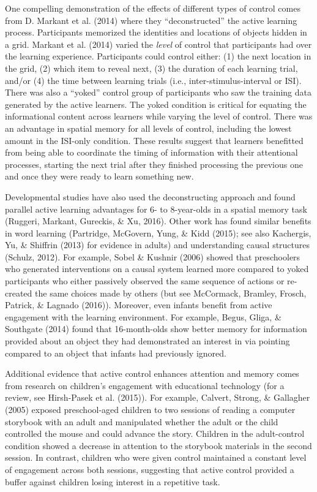 \documentclass[oneside]{report}
\begin{document}
One compelling demonstration of the effects of different types of
control comes from D. Markant et al. (2014) where they ``deconstructed''
the active learning process. Participants memorized the identities and
locations of objects hidden in a grid. Markant et al. (2014) varied the
\emph{level} of control that participants had over the learning
experience. Participants could control either: (1) the next location in
the grid, (2) which item to reveal next, (3) the duration of each
learning trial, and/or (4) the time between learning trials (i.e.,
inter-stimulus-interval or ISI). There was also a ``yoked'' control
group of participants who saw the training data generated by the active
learners. The yoked condition is critical for equating the informational
content across learners while varying the level of control. There was an
advantage in spatial memory for all levels of control, including the
lowest amount in the ISI-only condition. These results suggest that
learners benefitted from being able to coordinate the timing of
information with their attentional processes, starting the next trial
after they finished processing the previous one and once they were ready
to learn something new.

Developmental studies have also used the deconstructing approach and
found parallel active learning advantages for 6- to 8-year-olds in a
spatial memory task (Ruggeri, Markant, Gureckis, \& Xu, 2016). Other
work has found similar benefits in word learning (Partridge, McGovern,
Yung, \& Kidd (2015); see also Kachergis, Yu, \& Shiffrin (2013) for
evidence in adults) and understanding causal structures (Schulz, 2012).
For example, Sobel \& Kushnir (2006) showed that preschoolers who
generated interventions on a causal system learned more compared to
yoked participants who either passively observed the same sequence of
actions or re-created the same choices made by others (but see
McCormack, Bramley, Frosch, Patrick, \& Lagnado (2016)). Moreover, even
infants benefit from active engagement with the learning environment.
For example, Begus, Gliga, \& Southgate (2014) found that 16-month-olds
show better memory for information provided about an object they had
demonstrated an interest in via pointing compared to an object that
infants had previously ignored.

Additional evidence that active control enhances attention and memory
comes from research on children's engagement with educational technology
(for a review, see Hirsh-Pasek et al. (2015)). For example, Calvert,
Strong, \& Gallagher (2005) exposed preschool-aged children to two
sessions of reading a computer storybook with an adult and manipulated
whether the adult or the child controlled the mouse and could advance
the story. Children in the adult-control condition showed a decrease in
attention to the storybook materials in the second session. In contrast,
children who were given control maintained a constant level of
engagement across both sessions, suggesting that active control provided
a buffer against children losing interest in a repetitive task.
\end{document}
